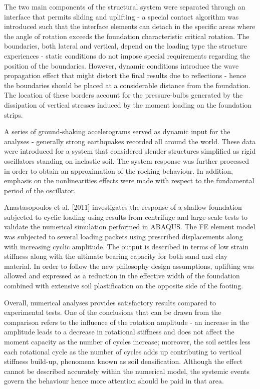 \documentclass[10pt,a4paper]{report}
\begin{document}
The two main components of the structural system were separated through an interface that permits sliding and uplifting - a special contact algorithm was introduced such that the interface elements can detach in the specific areas where the angle of rotation exceeds the foundation characteristic critical rotation. The boundaries, both lateral and vertical, depend on the loading type the structure experiences - static conditions do not impose special requirements regarding the position of the boundaries. However, dynamic conditions introduce the wave propagation effect that might distort the final results due to reflections - hence the boundaries should be placed at a considerable distance from the foundation. The location of these borders account for the pressure-bulbs generated by the dissipation of vertical stresses induced by the moment loading on the foundation strips.

A series of ground-shaking accelerograms served as dynamic input for the analyses - generally strong earthquakes recorded all around the world. These data were introduced for a system that considered slender structures simplified as rigid oscillators standing on inelastic soil. The system response was further processed in order to obtain an approximation of the rocking behaviour. In addition, emphasis on the nonlinearities effects were made with respect to the fundamental period of the oscillator.

Anastasopoulos et al. [2011] investigates the response of a shallow foundation subjected to cyclic loading using results from centrifuge and large-scale tests to validate the numerical simulation performed in ABAQUS. The FE element model was subjected to several loading packets using prescribed displacements along with increasing cyclic amplitude. The output is described in terms of low strain stiffness along with the ultimate bearing capacity for both sand and clay material. In order to follow the new philosophy design assumptions, uplifting was allowed and expressed as a reduction in the effective width of the foundation combined with extensive soil plastification on the opposite side of the footing.

Overall, numerical analyses provides satisfactory results compared to experimental tests. One of the conclusions that can be drawn from the comparison refers to the influence of the rotation amplitude - an increase in the amplitude leads to a decrease in rotational stiffness and does not affect the moment capacity as the number of cycles increase; moreover, the soil settles less each rotational cycle as the number of cycles adds up contributing to vertical stiffness build-up, phenomena known as soil densification. Although the effect cannot be described accurately within the numerical model, the systemic events govern the behaviour hence more attention should be paid in that area.
\end{document}
